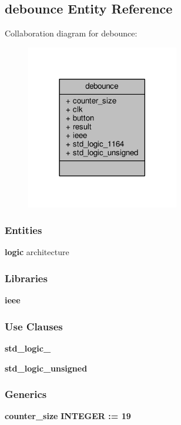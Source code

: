 \subsection{debounce Entity Reference}
\label{classdebounce}


Collaboration diagram for debounce\+:\nopagebreak
\begin{figure}[H]
\begin{center}
\leavevmode
\includegraphics[width=189pt]{d7/d52/classdebounce__coll__graph}
\end{center}
\end{figure}
\subsubsection*{Entities}
\begin{DoxyCompactItemize}
\item 
{\bf logic} architecture
\end{DoxyCompactItemize}
\subsubsection*{Libraries}
 \begin{DoxyCompactItemize}
\item 
{\bf ieee} 
\end{DoxyCompactItemize}
\subsubsection*{Use Clauses}
 \begin{DoxyCompactItemize}
\item 
{\bf std\+\_\+logic\+\_}   
\item 
{\bf std\+\_\+logic\+\_\+unsigned}   
\end{DoxyCompactItemize}
\subsubsection*{Generics}
 \begin{DoxyCompactItemize}
\item 
{\bf counter\+\_\+size} {\bfseries {\bfseries \textcolor{comment}{I\+N\+T\+E\+G\+ER}\textcolor{vhdlchar}{ }\textcolor{vhdlchar}{ }\textcolor{vhdlchar}{\+:}\textcolor{vhdlchar}{=}\textcolor{vhdlchar}{ }\textcolor{vhdlchar}{ } \textcolor{vhdldigit}{19} \textcolor{vhdlchar}{ }}}
\end{DoxyCompactItemize}
